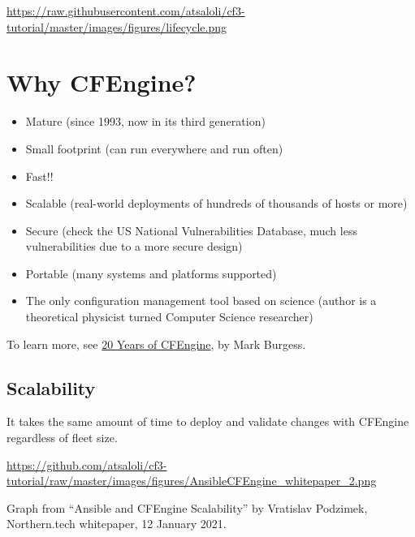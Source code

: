 \href{https://raw.githubusercontent.com/atsaloli/cf3-tutorial/master/images/figures/lifecycle.png}{https://raw.githubusercontent.com/atsaloli/cf3-tutorial/master/images/figures/lifecycle.png}










\section{Why CFEngine?}

\begin{itemize}
\item{} Mature (since 1993, now in its third generation)
\item{} Small footprint (can run everywhere and run often)
\item{} Fast!!
\item{} Scalable (real-world deployments of hundreds of thousands of hosts
or more)
\item{} Secure (check the US National Vulnerabilities Database, much less
vulnerabilities due to a more secure design)
\item{} Portable (many systems and platforms supported)
\item{} The only configuration management tool based on science (author is a
theoretical physicist turned Computer Science researcher)
\end{itemize}

To learn more, see \href{http://markburgess.org/blog_principles.html}{20 Years of
CFEngine}, by Mark Burgess.





\subsection{Scalability}

It takes the same amount of time to deploy and validate changes
with CFEngine regardless of fleet size.

\href{https://github.com/atsaloli/cf3-tutorial/raw/master/images/figures/AnsibleCFEngine_whitepaper_2.png}{https://github.com/atsaloli/cf3-tutorial/raw/master/images/figures/AnsibleCFEngine\_whitepaper\_2.png}

Graph from ``Ansible and CFEngine Scalability'' by Vratislav Podzimek, Northern.tech
whitepaper, 12 January 2021.





